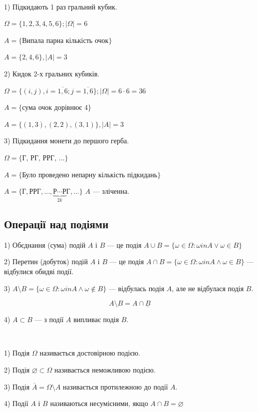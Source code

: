  \begin{example}~\par
    1) Підкидають 1 раз гральний кубик.\par
    $\Omega = \{1, 2, 3, 4, 5,6\}; |\Omega| = 6$\par
    $A = \{$Випала парна кількість очок$\}$\par
    $A = \{2, 4, 6\}, |A| = 3$

    2) Кидок 2-х гральних кубиків.\par
    $\Omega = \{(i,j), i=\overline{1,6};
        j=\overline{1,6}\}; |\Omega| = 6 \cdot 6 = 36$\par
    $A = \{$сума очок дорівнює 4$\}$\par
    $A = \{(1,3), (2,2), (3,1)\}, |A| = 3$

    3) Підкидання монети до першого герба.\par
    $\Omega = \{$Г, РГ, РРГ, ...$\}$\par
    $A = \{$Було проведено непарну кількість підкидань$\}$\par
    $A = \{\text{Г}, \text{РРГ}, ..., \underbrace{\text{Р}\cdots\text{Р}}\limits_{2k}\text{Г}, ...\}$
    $A$ --- зліченна.

    \subsection{Операції над подіями}

    1) Обєднання (сума) подій $A$ і $B$ --- це подія
    $A \cup B = \{\omega \in \Omega: \omega in A \vee \omega \in B\}$

    2) Перетин (добуток) подій $A$ і $B$ --- це подія
    $A \cap B = \{\omega \in \Omega: \omega in A \wedge \omega \in B\}$
    --- відбулися обидві події.

    3) $A \setminus B = \{\omega \in \Omega: \omega in A \wedge \omega \notin B\}$
    --- відбулась подія $A$, але не відбулася подія $B$.

    $$A \setminus B = A \cap \underline{B}$$

    4) $A \subset B$ --- з події $A$ випливає подія $B$.
 \end{example}

\begin{definition}~\par
    1) Подія $\Omega$ називається достовірною подією.
    
    2) Подія $\varnothing \subset \Omega$ називається неможливою
    подією.

    3) Подія $\overline{A} = \Omega \setminus A$ називається
    протилежною до події $A$.

    4) Події $A$ і $B$ називаються несумісними, якщо
    $A \cap B = \varnothing$
\end{definition}

